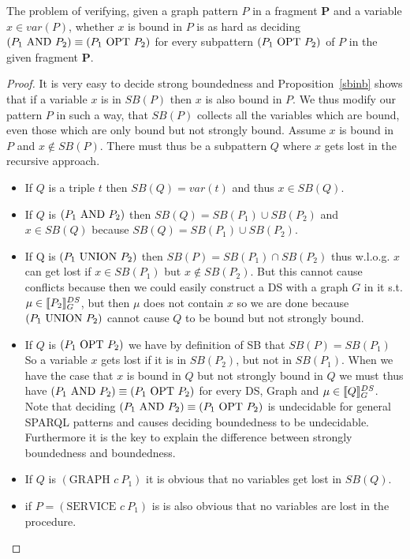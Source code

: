 \begin{theorem}\label{ezprop}
	The problem of verifying, given a graph pattern $P$ in a fragment
	$\mathbf{P}$ and a variable $x \in
	var(P)$, whether $x$ is bound in $P$ is as hard as deciding $(P_1 \mbox{ AND } 
	P_2)
	\equiv (P_1 \mbox{ OPT } P_2)$ for every subpattern $(P_1 \mbox{ OPT }  P_2)$ of $P$ in the
	given fragment $\mathbf{P}$.
\end{theorem}
\begin{proof}
	It is very easy to decide strong boundedness and Proposition~\ref{sbinb}
	shows that if a variable $x$ is in $SB(P)$ then $x$ is also bound in $P$.
	We thus modify our pattern $P$ in such a way, that $SB(P)$ collects all the
	variables which are bound, even those which are only bound but not strongly
	bound.
	Assume $x$ is bound in $P$ and $x \notin SB(P)$.
	There must thus be a subpattern $Q$ where $x$ gets lost in the recursive
	approach.
	\begin{itemize}
		\item If $Q$ is a triple $t$ then $SB(Q) = var(t)$ and thus $x \in SB(Q)$.
		\item If $Q$ is $(P_1 \mbox{ AND }   P_2)$ then $SB(Q) = SB(P_1) \cup SB(P_2)$
			and $x \in SB(Q)$ because $SB(Q) = SB(P_1) \cup SB(P_2)$.
		\item If Q is $(P_1 \mbox{ UNION }  P_2)$ then $SB(P) = SB(P_1) \cap SB(P_2)$ thus
			w.l.o.g. $x$ can get lost if $x \in SB(P_1)$ but $x \notin
			SB(P_2)$. But this cannot cause conflicts because then we could
			easily construct a DS with a graph $G$ in it s.t. $\mu \in \llbracket P_2
			\rrbracket^{DS}_G$, but then $\mu$ does not contain $x$ so we are done
			because $(P_1  \mbox{ UNION }  P_2)$ cannot cause $Q$ to be bound but not
			strongly bound.
		\item If $Q$ is $(P_1 \mbox{ OPT }  P_2)$ we have by definition of SB that $SB(P) = SB(P_1)$
			So a variable $x$ gets lost if it is in $SB(P_2)$, but not in
			$SB(P_1)$. When we have the case that $x$ is bound in $Q$ but not
			strongly bound in $Q$ we must thus have $(P_1 \mbox{ AND }  P_2) \equiv
			(P_1 \mbox{ OPT }  P_2)$ for every DS, Graph and $\mu \in \llbracket Q
			\rrbracket^{DS}_G$.
			Note that deciding $(P_1 \mbox{ AND } P_2) \equiv
			(P_1 \mbox{ OPT }  P_2)$ is undecidable for general SPARQL patterns and causes deciding
			boundedness to be undecidable. Furthermore it is the key to explain
			the difference between strongly boundedness and boundedness.
		\item If $Q$ is $(\mbox{GRAPH } c \ P_1)$ it is obvious that no variables get lost
			in $SB(Q)$.
		\item if $P = (\mbox{SERVICE }  c \ P_1)$ is is also obvious that no variables are
			lost in the procedure.
	\end{itemize}
\end{proof}

